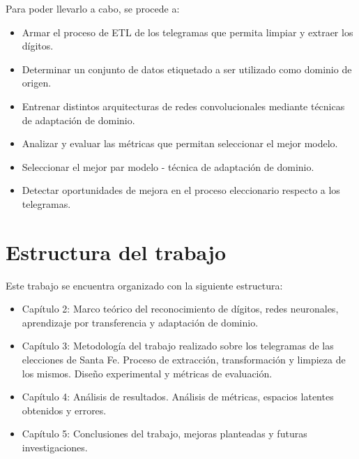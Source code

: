Para poder llevarlo a cabo, se procede a:
\begin{itemize}
    \item Armar el proceso de ETL de los telegramas que permita limpiar y extraer los dígitos.
    \item Determinar un conjunto de datos etiquetado a ser utilizado como dominio de origen.
    \item Entrenar distintos arquitecturas de redes convolucionales mediante técnicas de adaptación de dominio.
    \item Analizar y evaluar las métricas que permitan seleccionar el mejor modelo.
    \item Seleccionar el mejor par modelo - técnica de adaptación de dominio.
    \item Detectar oportunidades de mejora en el proceso eleccionario respecto a los telegramas.
\end{itemize}

\section{Estructura del trabajo}
Este trabajo se encuentra organizado con la siguiente estructura:

\begin{itemize}
    \item Capítulo 2: Marco teórico del reconocimiento de dígitos, redes neuronales, aprendizaje por transferencia y adaptación
          de dominio.
    \item Capítulo 3: Metodología del trabajo realizado sobre los telegramas de las elecciones de Santa Fe. Proceso de
          extracción, transformación y limpieza de los mismos. Diseño experimental y métricas de evaluación.
    \item Capítulo 4: Análisis de resultados. Análisis de métricas, espacios latentes obtenidos y errores.
    \item Capítulo 5: Conclusiones del trabajo, mejoras planteadas y futuras investigaciones.
\end{itemize}